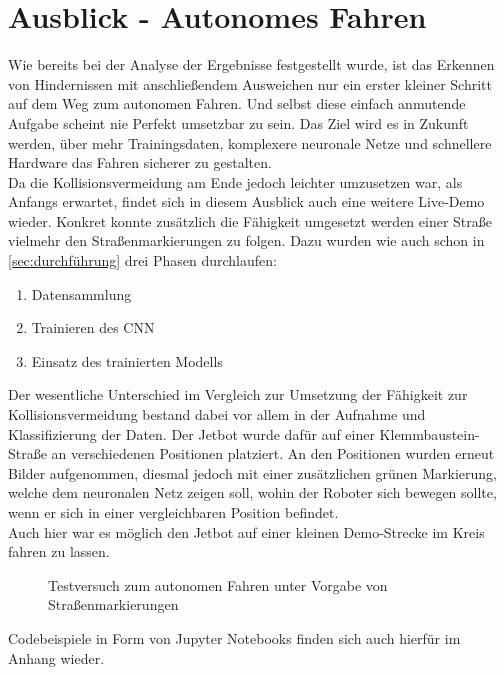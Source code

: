 \section{Ausblick - Autonomes Fahren} \label{sec:ausblick}

Wie bereits bei der Analyse der Ergebnisse festgestellt wurde, ist das Erkennen von Hindernissen mit anschließendem Ausweichen nur ein erster kleiner Schritt auf dem Weg zum autonomen Fahren. Und selbst diese einfach anmutende Aufgabe scheint nie Perfekt umsetzbar zu sein. Das Ziel wird es in Zukunft werden, über mehr Trainingsdaten, komplexere neuronale Netze und schnellere Hardware das Fahren sicherer zu gestalten.\\
Da die Kollisionsvermeidung am Ende jedoch leichter umzusetzen war, als Anfangs erwartet, findet sich in diesem Ausblick auch eine weitere Live-Demo wieder. Konkret konnte zusätzlich die Fähigkeit umgesetzt werden einer Straße \bzw vielmehr den Straßenmarkierungen zu folgen. Dazu wurden wie auch schon in \autoref{sec:durchführung} drei Phasen durchlaufen:

\begin{enumerate}
    \item Datensammlung
    \item Trainieren des CNN
    \item Einsatz des trainierten Modells
\end{enumerate}

Der wesentliche Unterschied im Vergleich zur Umsetzung der Fähigkeit zur Kollisionsvermeidung bestand dabei vor allem in der Aufnahme und Klassifizierung der Daten. Der Jetbot wurde dafür auf einer Klemmbaustein-Straße an verschiedenen Positionen platziert. An den Positionen wurden erneut Bilder aufgenommen, diesmal jedoch mit einer zusätzlichen grünen Markierung, welche dem neuronalen Netz zeigen soll, wohin der Roboter sich bewegen sollte, wenn er sich in einer vergleichbaren Position befindet. \\
Auch hier war es möglich den Jetbot auf einer kleinen Demo-Strecke im Kreis fahren zu lassen.

\begin{figure}[H]
    \centering
    \caption[Folgen von Straßenmarkierungen]{Testversuch zum autonomen Fahren unter Vorgabe von Straßenmarkierungen}
    \label{fig:Bild6.1}
\end{figure}

Codebeispiele in Form von Jupyter Notebooks finden sich auch hierfür im Anhang wieder.